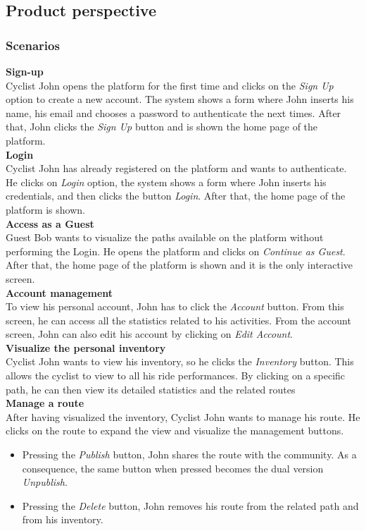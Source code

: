 \subsection{Product perspective}
\subsubsection{Scenarios}
\textbf{Sign-up} \\ [5pt]
Cyclist John opens the platform for the first time and clicks on the \textit{Sign Up} option to create a new account. The system shows a form where John inserts his name, his email and chooses a password to authenticate the next times. After that, John clicks the \textit{Sign Up} button and is shown the home page of the platform.\\[8pt]
\textbf{Login} \\ [5pt]
Cyclist John has already registered on the platform and wants to authenticate. He clicks on \textit{Login} option, the system shows a form where John inserts his credentials, and then clicks the button \textit{Login}. After that, the home page of the platform is shown.\\[8pt]
\textbf{Access as a Guest}\\ [5pt]
Guest Bob wants to visualize the paths available on the platform without performing the Login. He opens the platform and clicks on \textit{Continue as Guest}. After that, the home page of the platform is shown and it is the only interactive screen.\\[8pt]
\textbf{Account management} \\[5pt]
To view his personal account, John has to click the \textit{Account} button. From this screen, he can access all the statistics related to his activities. From the account screen, John can also edit his account by clicking on \textit{Edit Account}. 
\\[8pt]
\textbf{Visualize the personal inventory} \\[5pt] Cyclist John wants to view his inventory, so he clicks the \textit{Inventory} button. This allows the cyclist to view to all his ride performances. By clicking on a specific path, he can then view its detailed statistics and the related routes 
\\[8pt]
\textbf{Manage a route} \\[5pt]
After having visualized the inventory, Cyclist John wants to manage his route. He clicks on the route to expand the view and visualize the management buttons.
\begin{itemize}
    \item Pressing the \textit{Publish} button, John shares the route with the community. As a consequence, the same button when pressed becomes the dual version \textit{Unpublish}.
    \item Pressing the \textit{Delete} button, John removes his route from the related path and from his inventory.
\end{itemize} 

